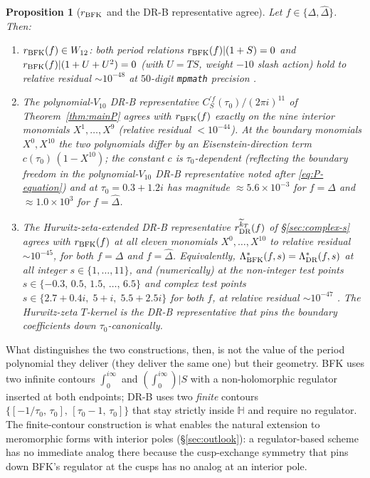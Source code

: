 \documentclass[11pt,letterpaper]{article}
\newtheorem{proposition}[theorem]{Proposition}
\newcommand{\HH}{\mathbb{H}}
\newcommand{\Dhat}{\widehat{\Delta}}
\begin{document}
\begin{proposition}[$r_{\rm BFK}$ and the DR-B representative agree]\label{prop:bfk-eq-dr}
Let $f \in \{\Delta, \Dhat\}$.  Then:
\begin{enumerate}
\item $r_{\rm BFK}(f) \in W_{12}$: both period relations
$r_{\rm BFK}(f)|(1+S) = 0$ and $r_{\rm BFK}(f)|(1+U+U^2) = 0$ (with
$U = TS$, weight $-10$ slash action) hold to relative residual
$\sim 10^{-48}$ at $50$-digit \texttt{mpmath} precision
\cite{ComplexSScript}.
\item The polynomial-$V_{10}$ DR-B representative
$C^{\prime f}_S(\tau_0)/(2\pi i)^{11}$ of Theorem~\ref{thm:mainP} agrees
with $r_{\rm BFK}(f)$ exactly on the nine interior monomials
$X^1, \ldots, X^9$ (relative residual $< 10^{-44}$).  At the boundary
monomials $X^0, X^{10}$ the two polynomials differ by an
Eisenstein-direction term $c(\tau_0)\,(1 - X^{10})$; the constant $c$
is $\tau_0$-dependent (reflecting the boundary freedom in the
polynomial-$V_{10}$ DR-B representative noted after
\eqref{eq:P-equation}) and at $\tau_0 = 0.3 + 1.2i$ has magnitude
$\approx 5.6\times 10^{-3}$ for $f = \Delta$ and
$\approx 1.0\times 10^{3}$ for $f = \Dhat$.
\item The Hurwitz-zeta-extended DR-B representative
$r_{\rm DR}^{\widetilde k_T}(f)$ of \S\ref{sec:complex-s} agrees with
$r_{\rm BFK}(f)$ at \emph{all} eleven monomials
$X^0, \ldots, X^{10}$ to relative residual $\sim 10^{-45}$, for both
$f = \Delta$ and $f = \Dhat$.  Equivalently,
$\Lambda^*_{\rm BFK}(f, s) = \Lambda^*_{\rm DR}(f, s)$ at all integer
$s \in \{1, \ldots, 11\}$, and (numerically) at the non-integer test
points $s \in \{-0.3,\,0.5,\,1.5,\,\ldots,\,6.5\}$ and complex test
points $s \in \{2.7 + 0.4i,\;5 + i,\;5.5 + 2.5i\}$ for both $f$, at
relative residual $\sim 10^{-47}$ \cite{ComplexSScript}.  The
Hurwitz-zeta $T$-kernel is the DR-B representative that pins the
boundary coefficients down $\tau_0$-canonically.
\end{enumerate}
\end{proposition}

What distinguishes the two constructions, then, is not the value of
the period polynomial they deliver (they deliver the same one) but
their geometry.  BFK uses two infinite contours $\int_0^{i\infty}$ and
$(\int_0^{i\infty})|S$ with a non-holomorphic regulator inserted at
both endpoints; DR-B uses two \emph{finite} contours
$\{[-1/\tau_0,\,\tau_0],\,[\tau_0 - 1,\,\tau_0]\}$ that stay strictly
inside $\HH$ and require no regulator.  The finite-contour
construction is what enables the natural extension to meromorphic
forms with interior poles (\S\ref{sec:outlook}): a regulator-based
scheme has no immediate analog there because the cusp-exchange
symmetry that pins down BFK's regulator at the cusps has no analog at
an interior pole.
\end{document}
